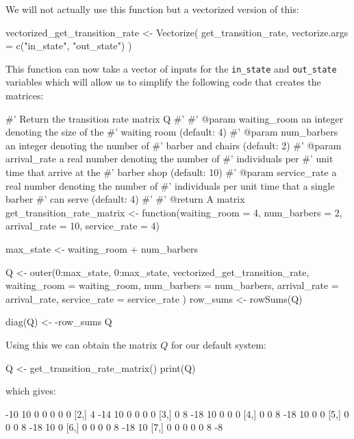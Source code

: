 We will not actually use this function but a vectorized version of this:

\begin{Rin}
vectorized_get_transition_rate <- Vectorize(
  get_transition_rate,
  vectorize.args = c("in_state", "out_state")
)
\end{Rin}

This function can now take a vector of inputs for the \texttt{in_state}
and \texttt{out_state} variables which will allow us to simplify the
following code that creates the matrices:

\begin{Rin}
#' Return the transition rate matrix Q
#'
#' @param waiting_room an integer denoting the size of the
#'        waiting room (default: 4)
#' @param num_barbers an integer denoting the number of
#'        barber and chairs (default: 2)
#' @param arrival_rate a real number denoting the number of
#'        individuals per #' unit time that arrive at the
#'        barber shop (default: 10)
#' @param service_rate a real number denoting the number of
#'        individuals per unit time that a single barber
#'        can serve (default: 4)
#'
#' @return A matrix
get_transition_rate_matrix <- function(waiting_room = 4,
                                       num_barbers = 2,
                                       arrival_rate = 10,
                                       service_rate = 4) {
  max_state <- waiting_room + num_barbers

  Q <- outer(0:max_state,
    0:max_state,
    vectorized_get_transition_rate,
    waiting_room = waiting_room,
    num_barbers = num_barbers,
    arrival_rate = arrival_rate,
    service_rate = service_rate
  )
  row_sums <- rowSums(Q)

  diag(Q) <- -row_sums
  Q
}
\end{Rin}

Using this we can obtain the matrix \(Q\) for our default system:

\begin{Rin}
Q <- get_transition_rate_matrix()
print(Q)
\end{Rin}

which gives:

\begin{Rout}
     [,1] [,2] [,3] [,4] [,5] [,6] [,7]
[1,]  -10   10    0    0    0    0    0
[2,]    4  -14   10    0    0    0    0
[3,]    0    8  -18   10    0    0    0
[4,]    0    0    8  -18   10    0    0
[5,]    0    0    0    8  -18   10    0
[6,]    0    0    0    0    8  -18   10
[7,]    0    0    0    0    0    8   -8
\end{Rout}

